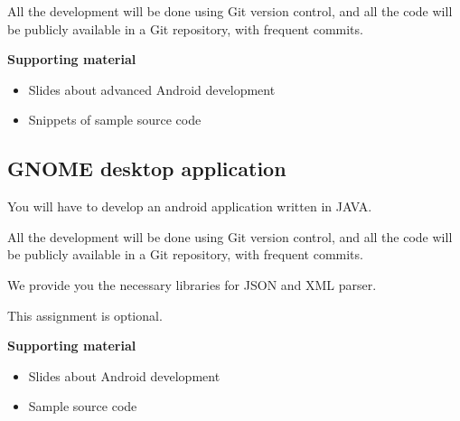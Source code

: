 \documentclass[a4paper]{article}
\begin{document}
All the development will be done using Git version control, and all
the code will be publicly available in a Git repository, with frequent
commits.

\textbf{Supporting material}

\begin{itemize}
\item Slides about advanced Android development
\item Snippets of sample source code
\end{itemize}


\subsection{GNOME desktop application}
\label{sub:gnome}

You will have to develop an android application written in JAVA.

All the development will be done using Git version control, and all
the code will be publicly available in a Git repository, with frequent
commits.

We provide you the necessary libraries for JSON and XML parser.

This assignment is optional.


\textbf{Supporting material}

\begin{itemize}
\item Slides about Android development
\item Sample source code
\end{itemize}


\end{document}
